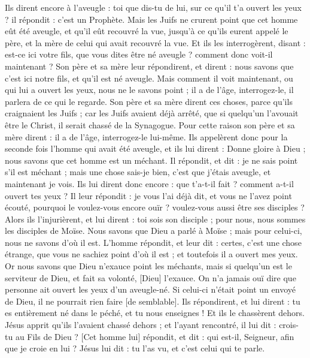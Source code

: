 \begin{multicols}{2}
Ils dirent encore à l'aveugle : toi que dis-tu de lui, sur ce qu'il t'a ouvert les yeux ? il répondit : c'est un Prophète.
Mais les Juifs ne crurent point que cet homme eût été aveugle, et qu'il eût recouvré la vue, jusqu'à ce qu'ils eurent appelé le père, et la mère de celui qui avait recouvré la vue.
Et ils les interrogèrent, disant : est-ce ici votre fils, que vous dites être né aveugle ? comment donc voit-il maintenant ?
Son père et sa mère leur répondirent, et dirent : nous savons que c'est ici notre fils, et qu'il est né aveugle.
Mais comment il voit maintenant, ou qui lui a ouvert les yeux, nous ne le savons point ; il a de l'âge, interrogez-le, il parlera de ce qui le regarde.
Son père et sa mère dirent ces choses, parce qu'ils craignaient les Juifs ; car les Juifs avaient déjà arrêté, que si quelqu'un l'avouait être le Christ, il serait chassé de la Synagogue.
Pour cette raison son père et sa mère dirent : il a de l'âge, interrogez-le lui-même.
Ils appelèrent donc pour la seconde fois l'homme qui avait été aveugle, et ils lui dirent : Donne gloire à Dieu ; nous savons que cet homme est un méchant.
Il répondit, et dit : je ne sais point s'il est méchant ; mais une chose sais-je bien, c'est que j'étais aveugle, et maintenant je vois.
Ils lui dirent donc encore : que t'a-t-il fait ? comment a-t-il ouvert tes yeux ?
Il leur répondit : je vous l'ai déjà dit, et vous ne l'avez point écouté, pourquoi le voulez-vous encore ouïr ? voulez-vous aussi être ses disciples ?
Alors ils l'injurièrent, et lui dirent : toi sois son disciple ; pour nous, nous sommes les disciples de Moïse.
Nous savons que Dieu a parlé à Moïse ; mais pour celui-ci, nous ne savons d'où il est.
L'homme répondit, et leur dit : certes, c'est une chose étrange, que vous ne sachiez point d'où il est ; et toutefois il a ouvert mes yeux.
Or nous savons que Dieu n'exauce point les méchants, mais si quelqu'un est le serviteur de Dieu, et fait sa volonté, [Dieu] l'exauce.
On n'a jamais ouï dire que personne ait ouvert les yeux d'un aveugle-né.
Si celui-ci n'était point un envoyé de Dieu, il ne pourrait rien faire [de semblable].
Ils répondirent, et lui dirent : tu es entièrement né dans le péché, et tu nous enseignes ! Et ils le chassèrent dehors.
Jésus apprit qu'ils l'avaient chassé dehors ; et l'ayant rencontré, il lui dit : crois-tu au Fils de Dieu ?
[Cet homme lui] répondit, et dit : qui est-il, Seigneur, afin que je croie en lui ?
Jésus lui dit : tu l'as vu, et c'est celui qui te parle.

\end{multicols}

